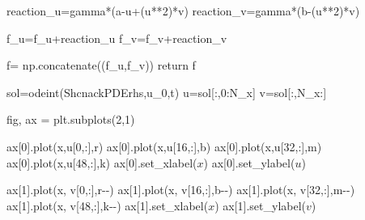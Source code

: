 \documentclass[
  letterpaper,
  DIV=11,
  numbers=noendperiod]{scrreprt}
\newenvironment{Shaded}{\begin{snugshade}}{\end{snugshade}}
\newcommand{\ControlFlowTok}[1]{\textcolor[rgb]{0.00,0.23,0.31}{#1}}
\newcommand{\DecValTok}[1]{\textcolor[rgb]{0.68,0.00,0.00}{#1}}
\newcommand{\NormalTok}[1]{\textcolor[rgb]{0.00,0.23,0.31}{#1}}
\newcommand{\OperatorTok}[1]{\textcolor[rgb]{0.37,0.37,0.37}{#1}}
\newcommand{\StringTok}[1]{\textcolor[rgb]{0.13,0.47,0.30}{#1}}
\theoremstyle{plain}
\theoremstyle{definition}
\theoremstyle{plain}
\theoremstyle{remark}
\begin{document}
\begin{Shaded}
\begin{Highlighting}[]
\NormalTok{    reaction\_u}\OperatorTok{=}\NormalTok{gamma}\OperatorTok{*}\NormalTok{(a}\OperatorTok{{-}}\NormalTok{u}\OperatorTok{+}\NormalTok{(u}\OperatorTok{**}\DecValTok{2}\NormalTok{)}\OperatorTok{*}\NormalTok{v)}
\NormalTok{    reaction\_v}\OperatorTok{=}\NormalTok{gamma}\OperatorTok{*}\NormalTok{(b}\OperatorTok{{-}}\NormalTok{(u}\OperatorTok{**}\DecValTok{2}\NormalTok{)}\OperatorTok{*}\NormalTok{v)}

\NormalTok{    f\_u}\OperatorTok{=}\NormalTok{f\_u}\OperatorTok{+}\NormalTok{reaction\_u}
\NormalTok{    f\_v}\OperatorTok{=}\NormalTok{f\_v}\OperatorTok{+}\NormalTok{reaction\_v}

\NormalTok{    f}\OperatorTok{=}\NormalTok{ np.concatenate((f\_u,f\_v)) }
    \ControlFlowTok{return}\NormalTok{ f  }

\NormalTok{sol}\OperatorTok{=}\NormalTok{odeint(ShcnackPDErhs,u\_0,t)}
\NormalTok{u}\OperatorTok{=}\NormalTok{sol[:,}\DecValTok{0}\NormalTok{:N\_x]}
\NormalTok{v}\OperatorTok{=}\NormalTok{sol[:,N\_x:]}

\NormalTok{fig, ax }\OperatorTok{=}\NormalTok{ plt.subplots(}\DecValTok{2}\NormalTok{,}\DecValTok{1}\NormalTok{)}

\NormalTok{ax[}\DecValTok{0}\NormalTok{].plot(x,u[}\DecValTok{0}\NormalTok{,:],}\StringTok{\textquotesingle{}r\textquotesingle{}}\NormalTok{)}
\NormalTok{ax[}\DecValTok{0}\NormalTok{].plot(x,u[}\DecValTok{16}\NormalTok{,:],}\StringTok{\textquotesingle{}b\textquotesingle{}}\NormalTok{)}
\NormalTok{ax[}\DecValTok{0}\NormalTok{].plot(x,u[}\DecValTok{32}\NormalTok{,:],}\StringTok{\textquotesingle{}m\textquotesingle{}}\NormalTok{)}
\NormalTok{ax[}\DecValTok{0}\NormalTok{].plot(x,u[}\DecValTok{48}\NormalTok{,:],}\StringTok{\textquotesingle{}k\textquotesingle{}}\NormalTok{)}
\NormalTok{ax[}\DecValTok{0}\NormalTok{].set\_xlabel(}\StringTok{\textquotesingle{}$x$\textquotesingle{}}\NormalTok{)}
\NormalTok{ax[}\DecValTok{0}\NormalTok{].set\_ylabel(}\StringTok{\textquotesingle{}$u$\textquotesingle{}}\NormalTok{)}

\NormalTok{ax[}\DecValTok{1}\NormalTok{].plot(x, v[}\DecValTok{0}\NormalTok{,:],}\StringTok{\textquotesingle{}r{-}{-}\textquotesingle{}}\NormalTok{)}
\NormalTok{ax[}\DecValTok{1}\NormalTok{].plot(x, v[}\DecValTok{16}\NormalTok{,:],}\StringTok{\textquotesingle{}b{-}{-}\textquotesingle{}}\NormalTok{)}
\NormalTok{ax[}\DecValTok{1}\NormalTok{].plot(x, v[}\DecValTok{32}\NormalTok{,:],}\StringTok{\textquotesingle{}m{-}{-}\textquotesingle{}}\NormalTok{)}
\NormalTok{ax[}\DecValTok{1}\NormalTok{].plot(x, v[}\DecValTok{48}\NormalTok{,:],}\StringTok{\textquotesingle{}k{-}{-}\textquotesingle{}}\NormalTok{)}
\NormalTok{ax[}\DecValTok{1}\NormalTok{].set\_xlabel(}\StringTok{\textquotesingle{}$x$\textquotesingle{}}\NormalTok{)}
\NormalTok{ax[}\DecValTok{1}\NormalTok{].set\_ylabel(}\StringTok{\textquotesingle{}$v$\textquotesingle{}}\NormalTok{)}


\end{Highlighting}
\end{Shaded}
\end{document}
